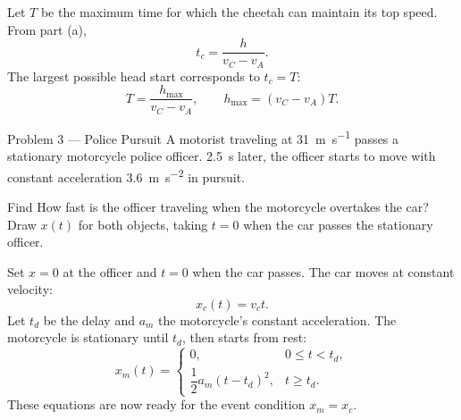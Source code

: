 \begin{solutionframe}
  Let $T$ be the maximum time for which the cheetah can maintain its top
  speed. From part (a),
  \[
    t_c=\frac{h}{v_C-v_A}.
  \]
  The largest possible head start corresponds to $t_c=T$:
  \[
    T=\frac{h_{\max}}{v_C-v_A},
    \qquad
    h_{\max}=(v_C-v_A)T.
  \]
\end{solutionframe}

\begin{frame}{Problem 3 — Police Pursuit}
  \vspace{0.2em}
  \footnotesize
  A motorist traveling at \SI{31}{\metre\per\second} passes a stationary
  motorcycle police officer. \SI{2.5}{\second} later, the officer starts to
  move with constant acceleration
  \SI{3.6}{\metre\per\second\squared} in pursuit.
  \begin{block}{Find}
    How fast is the officer traveling when the motorcycle overtakes the car?
    Draw $x(t)$ for both objects, taking $t=0$ when the car passes the
    stationary officer.
  \end{block}
  \centering
  \resizebox{0.74\textwidth}{!}{}
\end{frame}

\begin{solutionframe}
  Set $x=0$ at the officer and $t=0$ when the car passes. The car moves at
  constant velocity:
  \[
    x_c(t)=v_ct.
  \]
  Let $t_d$ be the delay and $a_m$ the motorcycle's constant acceleration. The
  motorcycle is stationary until $t_d$, then starts from rest:
  \[
    x_m(t)=
    \begin{cases}
      0, & 0\le t<t_d,\\[2pt]
      \dfrac12a_m(t-t_d)^2, & t\ge t_d.
    \end{cases}
  \]
  These equations are now ready for the event condition $x_m=x_c$.
\end{solutionframe}

